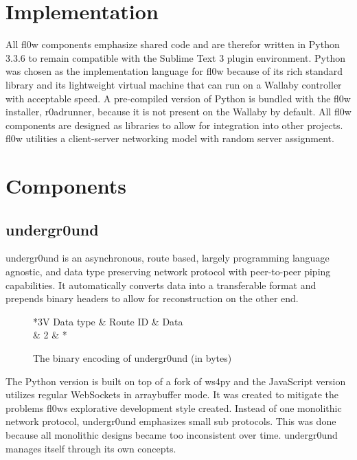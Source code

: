\documentclass[conference]{IEEEtran}
\begin{document}
\section{Implementation}
All fl0w components emphasize shared code and are therefor written in Python 3.3.6\cite{Python 3.3.6:Python Foundation} to remain compatible with the Sublime Text 3\cite{Sublime Text 3:Sublime HQ} plugin environment. Python was chosen as the implementation language for fl0w because of its rich standard library and its lightweight virtual machine that can run on a Wallaby controller with acceptable speed. A pre-compiled version of Python \cite{Python 3.3.6:Python Foundation} is bundled with the fl0w installer, r0adrunner, because it is not present on the Wallaby by default. All fl0w components are designed as libraries to allow for integration into other projects. fl0w utilities a client-server networking model with random server assignment.

\section{Components}

\subsection{undergr0und}
undergr0und\cite{undergr0und:Philip Trauner} is an asynchronous, route based, largely programming language agnostic, and data type preserving network protocol with peer-to-peer piping capabilities.
It automatically converts data into a transferable format and prepends binary headers to allow for reconstruction on the other end.

\begin{figure}[H]
\centering
	\begin{tabular}{*{3}{V}}
		Data type & Route ID & Data \\  & 2 & * \\
	\end{tabular}
	\caption{The binary encoding of undergr0und (in bytes)}
\label{fig:undergr0und_header}
\end{figure}


The Python\cite{Python 3.3.6:Python Foundation} version is built on top of a fork of ws4py\cite{ws4py:Philip Trauner} and the JavaScript version utilizes regular WebSockets\cite{The WebSocket Protocol:A. Melnikov} in arraybuffer mode. It was created to mitigate the problems fl0ws explorative development style created. Instead of one monolithic network protocol, undergr0und emphasizes small sub protocols. This was done because all monolithic designs became too inconsistent over time. undergr0und\cite{undergr0und:Philip Trauner} manages itself through its own concepts.\\
\end{document}
